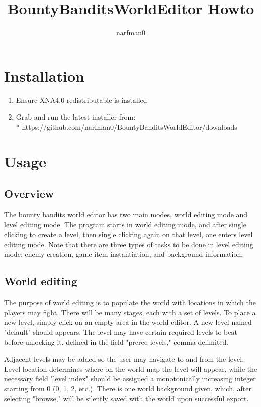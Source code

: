 \documentclass[letterpaper]{article}
\author{narfman0}
\title{BountyBanditsWorldEditor Howto}
\begin{document}
\maketitle

\section{Installation}
\begin{enumerate}
    \item Ensure XNA4.0 redistributable is installed
    \item Grab and run the latest installer from:\\*
https://github.com/narfman0/BountyBanditsWorldEditor/downloads
\end{enumerate}

\section{Usage}
\subsection{Overview}
The bounty bandits world editor has two main modes, world editing mode and level editing mode. The program starts in world editing mode, and after single clicking to create a level, then single clicking again on that level, one enters level editing mode. Note that there are three types of tasks to be done in level editing mode: enemy creation, game item instantiation, and background information.

\subsection{World editing}
The purpose of world editing is to populate the world with locations in which the players may fight. There will be many stages, each with a set of levels. To place a new level, simply click on an empty area in the world editor. A new level named "default" should appears. The level may have certain required levels 
to beat before unlocking it, defined in the field "prereq levels," comma delimited. 

Adjacent levels may be added so the user may navigate to and from the level. Level location determines where on the world map the level will appear, while the necessary field "level index" should be assigned a monotonically increasing integer starting from 0 (0, 1, 2, etc.). There is one world background given, which, after selecting "browse," will be silently saved with the world upon successful export.
\end{document}
